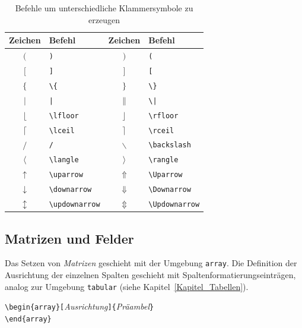\documentclass[a4paper,10pt,twoside]{scrbook}
\begin{document}
\begin{table}[h!tb]
\centering
\caption{Befehle um unterschiedliche Klammersymbole zu erzeugen}
\label{Tabelle_Klammern_Befehle}       %
\begin{tabular}{clcl}
\hline
Zeichen & Befehl & Zeichen & Befehl \\
\hline
$($ & \texttt{)}  & 
$)$ & \texttt{(}  \\
$[$ & \texttt{]}  &
$]$ & \texttt{[}  \\
$\{$ & \texttt{\textbackslash \{} &
$\}$ & \texttt{\textbackslash \}} \\
$|$ & \texttt{|} &
$\|$ & \texttt{\textbackslash |} \\
$\lfloor$ & \texttt{\textbackslash lfloor} &
$\rfloor$ & \texttt{\textbackslash rfloor} \\ 
$\lceil$ & \texttt{\textbackslash lceil} &
$\rceil$ & \texttt{\textbackslash rceil} \\
$/$ & \texttt{/} &  
$\backslash$ & \texttt{\textbackslash backslash} \\
$\langle$ & \texttt{\textbackslash langle} &
$\rangle$ & \texttt{\textbackslash rangle} \\  
$\uparrow$ & \texttt{\textbackslash uparrow} &
$\Uparrow$ & \texttt{\textbackslash Uparrow} \\
$\downarrow$ & \texttt{\textbackslash downarrow} &  
$\Downarrow$ & \texttt{\textbackslash Downarrow} \\
$\updownarrow$ & \texttt{\textbackslash updownarrow} &
$\Updownarrow$ & \texttt{\textbackslash Updownarrow}  \\
\hline
\end{tabular}
\end{table}




\subsection{Matrizen und Felder}

Das Setzen von \textsl{Matrizen} geschieht mit der Umgebung
\verb!array!. 
Die Definition der Ausrichtung der einzelnen Spalten geschieht mit 
Spaltenformatierungseinträgen, analog zur Umgebung \verb!tabular! (siehe Kapitel~\ref{Kapitel_Tabellen}).


\begin{boxedminipage}{\textwidth}
\texttt{\textbackslash begin\{array\}[}\textsl{Ausrichtung}\texttt{]\{}\textsl{Präambel}\texttt{\}} \\
\texttt{\textbackslash end\{array\}} 
\end{boxedminipage}
\end{document}
